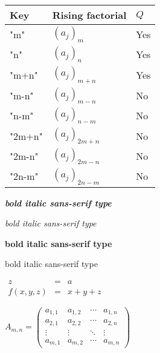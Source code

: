 \documentclass{article}
\begin{document}
\begin{table}[ht]
	\centering
	\begin{tabular}{|l|l|l|}
		\hline
		Key & Rising factorial & $Q$\\
		\hline
		"m" & $(a_j)_m$ &  Yes \\
		"n" & $(a_j)_n$ &  Yes \\
		"m+n" & $(a_j)_{m+n}$ &  Yes \\				
		"m-n" & $(a_j)_{m-n}$ &  No \\
		"n-m" & $(a_j)_{n-m}$ &  No \\
		"2m+n" & $(a_j)_{2m+n}$ &  No \\				
		"2m-n" & $(a_j)_{2m-n}$ &  No \\
		"2n-m" & $(a_j)_{2n-m}$ &  No \\
		\hline
	\end{tabular}
\end{table}

{\bfseries\itshape\sffamily bold italic sans-serif type}

{\itshape\sffamily bold italic sans-serif type}

{\bfseries\sffamily bold italic sans-serif type}

{\sffamily bold italic sans-serif type}


$\begin{array}{lcl} z & = & a \\ f(x,y,z) & = & x + y + z \end{array}$

$
A_{m,n} =
\begin{pmatrix}
a_{1,1} & a_{1,2} & \cdots & a_{1,n} \\
a_{2,1} & a_{2,2} & \cdots & a_{2,n} \\
\vdots  & \vdots  & \ddots & \vdots  \\
a_{m,1} & a_{m,2} & \cdots & a_{m,n}
\end{pmatrix}
$
\end{document}
